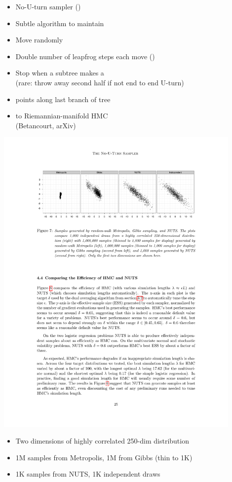 \documentclass[10pt]{report}
\newcommand{\sld}[1]{\newpage{\noindent\LARGE \ \ \
    \textcolor{MidnightBlue}{\bfseries #1}}\vspace*{4pt}}
\newcommand{\myemph}[1]{{\color{MidnightBlue}{\bfseries #1}}}
\begin{document}
\sld{Adapting HMC During Sampling}

\begin{itemize}
\item No-U-turn sampler (\myemph{NUTS})
\item Subtle algorithm to maintain \myemph{detailed balance}
\item Move randomly \myemph{forward or backward in time}
\item Double number of leapfrog steps each move (\myemph{binary tree})
\item Stop when a subtree makes a \myemph{U-turn}
  \\ {\footnotesize (rare: throw away second half if not end to end U-turn)}
\item \myemph{Slice sample} points along last branch of tree
\item \myemph{Generalized} to Riemannian-manifold HMC
  \\ {\footnotesize (Betancourt, arXiv)}
\end{itemize}

\sld{NUTS vs.\ Gibbs and Metropolis}

\includegraphics[width=0.9\textwidth]{img/nuts-vs.pdf}
\begin{itemize}
\item Two dimensions of highly correlated 250-dim distribution
\item 1M samples from Metropolis, 1M from Gibbs (thin to 1K)
\item 1K samples from NUTS, 1K independent draws
\end{itemize}
\end{document}
